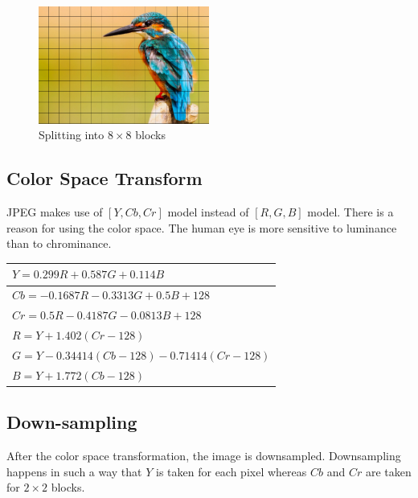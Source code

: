 \vspace{1em}

\begin{figure}[!ht]
    \centering
    \includegraphics[width=0.50\textwidth]{fig/3-3.png}
    \caption{Splitting into $8 \times 8$ blocks}
    \label{fig:splitting}
\end{figure}

\subsection{Color Space Transform}

JPEG makes use of $[Y, Cb, Cr]$ model instead of $[R, G, B]$ model. There is a reason for using the color space. The human eye is more sensitive to luminance than to chrominance. 

\begingroup
\centering
    \begin{tabular}{|l|}
    \hline
    $Y = 0.299R + 0.587G + 0.114B$              \\ \hline
    $Cb = -0.1687R - 0.3313G + 0.5B + 128$      \\ \hline
    $Cr = 0.5R - 0.4187G - 0.0813B + 128$       \\ \hline
    $R = Y + 1.402 (Cr - 128)$                   \\ \hline
    $G = Y - 0.34414 (Cb - 128) - 0.71414(Cr - 128)$ \\ \hline
    $B = Y + 1.772  (Cb - 128)$                   \\ \hline
    \end{tabular}
\label{tbl:RGBYCbCrTable}
\endgroup


\subsection{Down-sampling}

After the color space transformation, the image is downsampled.
Downsampling happens in such a way that $Y$ is taken for each pixel whereas $Cb$ and $Cr$ are taken for $2 \times 2$ blocks.

